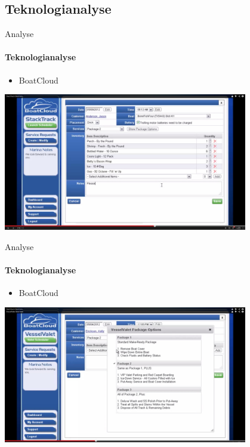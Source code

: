 \subsection{Teknologianalyse}



\begin{frame}{Analyse}
\framesubtitle{Teknologianalyse}
  \begin{itemize}
    \item BoatCloud
  \end{itemize}
        \includegraphics[width=0.8\textwidth]{images/StackTrack.jpg}
\end{frame}

\begin{frame}{Analyse}
\framesubtitle{Teknologianalyse}
  \begin{itemize}
    \item BoatCloud
  \end{itemize}
        \includegraphics[width=0.8\textwidth]{images/VesselValet.jpg}  
\end{frame}

